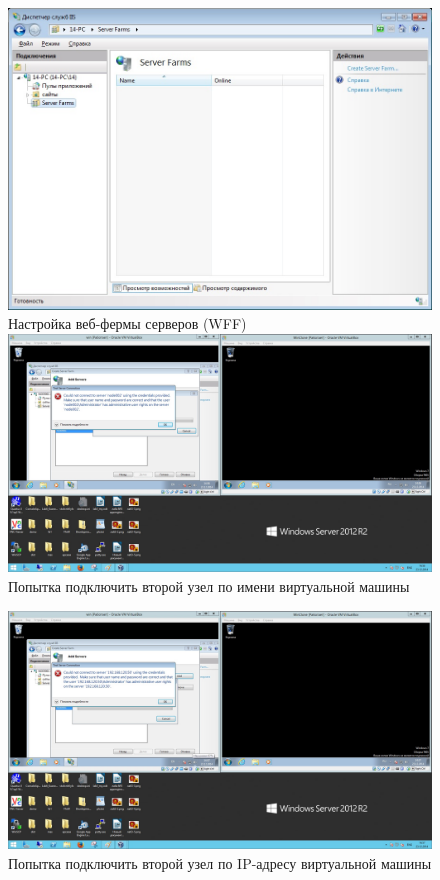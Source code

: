 \documentclass[pscyr,10pt]{hedlab}
\begin{document}
  \begin{figure}[h!]
    \center
    \includegraphics[width=.8\textwidth]{iis_wff_first}\\
    Настройка веб-фермы серверов (WFF)\\[2em]
    
    \includegraphics[width=.99\textwidth]{node002_fail}\\
    Попытка подключить второй узел по имени виртуальной машины
  \end{figure}
  
  \newpage
  
  \begin{figure}[h!]
    \center    
    \includegraphics[width=.99\textwidth]{node002_fail2}\\
    Попытка подключить второй узел по IP-адресу виртуальной машины
  \end{figure}
  
\end{document}
